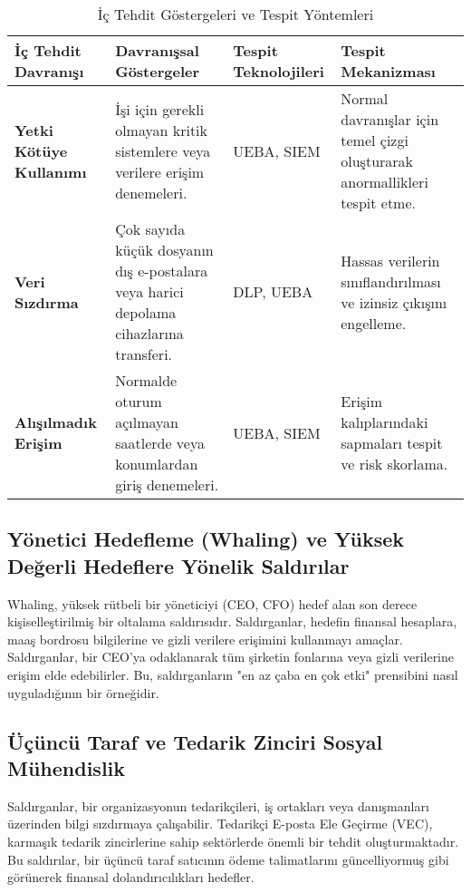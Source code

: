 \begin{longtable}{|>{\footnotesize}p{1.8cm}|>{\footnotesize}p{2.5cm}|>{\footnotesize}p{2cm}|>{\footnotesize}p{2.2cm}|}
    \caption{İç Tehdit Göstergeleri ve Tespit Yöntemleri} \\
    \hline
    \textbf{İç Tehdit Davranışı} & \textbf{Davranışsal Göstergeler} & \textbf{Tespit Teknolojileri} & \textbf{Tespit Mekanizması} \\
    \hline
    \endhead
    \textbf{Yetki Kötüye Kullanımı} & İşi için gerekli olmayan kritik sistemlere veya verilere erişim denemeleri. & UEBA, SIEM & Normal davranışlar için temel çizgi oluşturarak anormallikleri tespit etme. \\
    \hline
    \textbf{Veri Sızdırma} & Çok sayıda küçük dosyanın dış e-postalara veya harici depolama cihazlarına transferi. & DLP, UEBA & Hassas verilerin sınıflandırılması ve izinsiz çıkışını engelleme. \\
    \hline
    \textbf{Alışılmadık Erişim} & Normalde oturum açılmayan saatlerde veya konumlardan giriş denemeleri. & UEBA, SIEM & Erişim kalıplarındaki sapmaları tespit ve risk skorlama. \\
    \hline
\end{longtable}

\subsection{Yönetici Hedefleme (Whaling) ve Yüksek Değerli Hedeflere Yönelik Saldırılar}

Whaling, yüksek rütbeli bir yöneticiyi (CEO, CFO) hedef alan son derece kişiselleştirilmiş bir oltalama saldırısıdır. Saldırganlar, hedefin finansal hesaplara, maaş bordrosu bilgilerine ve gizli verilere erişimini kullanmayı amaçlar. Saldırganlar, bir CEO'ya odaklanarak tüm şirketin fonlarına veya gizli verilerine erişim elde edebilirler. Bu, saldırganların "en az çaba en çok etki" prensibini nasıl uyguladığının bir örneğidir.

\subsection{Üçüncü Taraf ve Tedarik Zinciri Sosyal Mühendislik}

Saldırganlar, bir organizasyonun tedarikçileri, iş ortakları veya danışmanları üzerinden bilgi sızdırmaya çalışabilir. Tedarikçi E-posta Ele Geçirme (VEC), karmaşık tedarik zincirlerine sahip sektörlerde önemli bir tehdit oluşturmaktadır. Bu saldırılar, bir üçüncü taraf satıcının ödeme talimatlarını güncelliyormuş gibi görünerek finansal dolandırıcılıkları hedefler.

